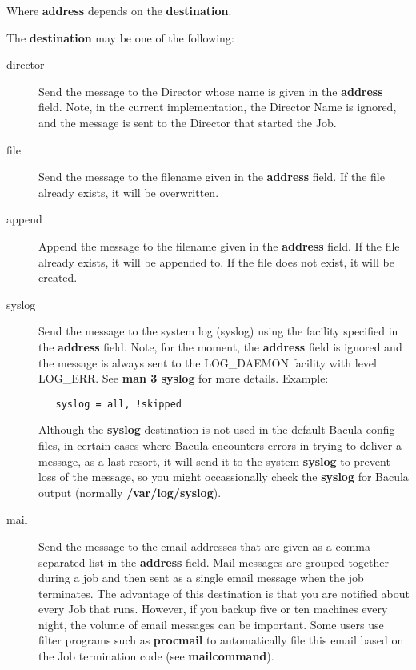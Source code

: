 \begin{description}
Where {\bf address} depends on the {\bf destination}. 

The {\bf destination} may be one of the following:  

\begin{description}

\item [director]
   Send the message to the Director whose name  is given in the {\bf address}
   field. Note, in the current  implementation, the Director Name is ignored, and
   the message  is sent to the Director that started the Job.  

\item [file]
   Send the message to the filename given in  the {\bf address} field. If the
   file already exists, it will be  overwritten.  

\item [append]
   Append the message to the filename given  in the {\bf address} field. If the
   file already exists, it will  be appended to. If the file does not exist, it
   will be created.  

\item [syslog]
   Send the message to the system log (syslog)  using the facility specified in
   the {\bf address} field.  Note, for the moment, the {\bf address} field is
   ignored  and the message is always sent to the LOG\_DAEMON facility with
   level LOG\_ERR. See {\bf man 3 syslog} for more details. Example:

\begin{verbatim}
   syslog = all, !skipped
\end{verbatim}

   Although the {\bf syslog} destination is not used in the default Bacula
   config files, in certain cases where Bacula encounters errors in trying
   to deliver a message, as a last resort, it will send it to the system
   {\bf syslog} to prevent loss of the message, so you might occassionally
   check the {\bf syslog} for Bacula output (normally {\bf
   /var/log/syslog}).

\item [mail]
   Send the message to the email addresses that are given as a comma
   separated list in the {\bf address} field.  Mail messages are grouped
   together during a job and then sent as a single email message when the
   job terminates.  The advantage of this destination is that you are
   notified about every Job that runs.  However, if you backup five or ten
   machines every night, the volume of email messages can be important.
   Some users use filter programs such as {\bf procmail} to automatically
   file this email based on the Job termination code (see {\bf
   mailcommand}).


\end{description}
\end{description}
